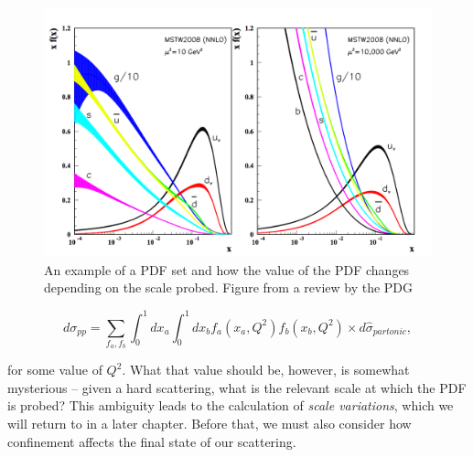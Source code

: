\begin{figure}[t]
\centering
\includegraphics[scale=0.7]{Images/PDF.png} 
\caption{An example of a PDF set and how the value of the PDF changes depending on the scale probed. Figure from a review by the PDG \cite{PDG}}
\label{fig:PDF}
\end{figure}

\begin{equation}
d \sigma_{pp} = \sum_{f_a, f_b} \int_0^1 dx_a \int_0^1 dx_b f_a(x_a, Q^2) f_b(x_b, Q^2) \times d\hat{\sigma}_{partonic},
\end{equation}

for some value of $Q^2$. What that value should be, however, is somewhat mysterious -- given a hard scattering, what is the relevant scale at which the PDF is probed? This ambiguity leads to the calculation of \emph{scale variations}, which we will return to in a later chapter. Before that, we must also consider how confinement affects the final state of our scattering. 

